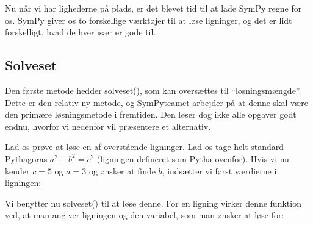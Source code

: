 \documentclass[letterpaper,10pt,english]{jupyterBook}
\begin{document}
\noindent{}

Nu når vi har lighederne på plads, er det blevet tid til at lade SymPy regne for os. SymPy giver os to forskellige værktøjer til at løse ligninger, og det er lidt forskelligt, hvad de hver især er gode til.


\subsection{Solveset}
\label{\detokenize{notebooks/sympy/Notebook3_ligninger:solveset}}
Den første metode hedder solveset(), som kan oversættes til “løsningsmængde”. Dette er den relativ ny metode, og SymPy\sphinxhyphen{}teamet arbejder på at denne skal være den primære løsningsmetode i fremtiden. Den løser dog ikke alle opgaver godt endnu, hvorfor vi nedenfor vil præsentere et alternativ.

Lad os prøve at løse en af overstående ligninger. Lad os tage helt standard Pythagoras \(a^2 + b^2 = c^2\) (ligningen defineret som Pytha ovenfor). Hvis vi nu  kender \(c=5\) og \(a=3\) og ønsker at finde \(b\), indsætter vi først værdierne i ligningen:

\begin{sphinxVerbatim}[commandchars=\\\{\}]
  \PYG{p}{[}   \PYG{p}{]}
\end{sphinxVerbatim}

\noindent{}

\noindent{}

Vi benytter nu solveset() til at løse denne. For en ligning virker denne funktion ved, at man angiver ligningen og den variabel, som man ønsker at løse for:

\begin{sphinxVerbatim}[commandchars=\\\{\}]
   
\end{sphinxVerbatim}
\end{document}

